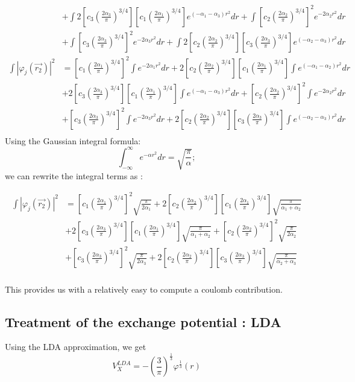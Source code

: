 \documentclass{article}
\begin{document}
\begin{align*}
                             &+ \int 2\left[ c_3 \left( \frac{2\alpha_3}{\pi} \right)^{3/4} \right] \left[ c_1  \left( \frac{2\alpha_1}{\pi} \right)^{3/4} \right] e^{(-\alpha_1  - \alpha_3 )r^2}dr + \int \left[ c_2  \left( \frac{2\alpha_2}{\pi} \right)^{3/4} \right] ^2 e^{-2\alpha_2 r^2}dr \\ 
                             &+ \int \left[ c_3  \left( \frac{2\alpha_3}{\pi} \right)^{3/4} \right] ^2 e^{-2\alpha_3 r^2}dr + \int 2 \left[ c_2 \left( \frac{2\alpha_2}{\pi} \right)^{3/4} \right] \left[ c_3  \left( \frac{2\alpha_3}{\pi} \right)^{3/4} \right] e^{(-\alpha_2 - \alpha_3 )r^2}dr \\
   \int |\varphi_j(\vec{r_2})|^2                         &= \left[ c_1  \left( \frac{2\alpha_1}{\pi} \right)^{3/4} \right] ^2 \int e^{-2\alpha_1 r^2}dr + 2 \left[ c_2 \left( \frac{2\alpha_2}{\pi} \right)^{3/4} \right] \left[ c_1  \left( \frac{2\alpha_1}{\pi} \right)^{3/4} \right] \int e^{(-\alpha_1 - \alpha_2 )r^2}dr \\
                             &+ 2\left[ c_3 \left( \frac{2\alpha_3}{\pi} \right)^{3/4} \right] \left[ c_1  \left( \frac{2\alpha_1}{\pi} \right)^{3/4} \right] \int e^{(-\alpha_1  - \alpha_3 )r^2}dr + \left[ c_2  \left( \frac{2\alpha_2}{\pi} \right)^{3/4} \right] ^2 \int e^{-2\alpha_2 r^2}dr \\ 
                             &+ \left[ c_3  \left( \frac{2\alpha_3}{\pi} \right)^{3/4} \right] ^2 \int e^{-2\alpha_3 r^2}dr + 2 \left[ c_2 \left( \frac{2\alpha_2}{\pi} \right)^{3/4} \right] \left[ c_3  \left( \frac{2\alpha_3}{\pi} \right)^{3/4} \right] \int e^{(-\alpha_2 - \alpha_3 )r^2}dr \\
\end{align*}
   Using the Gaussian integral formula:  \[\int_{-\infty}^{\infty} e^{-\alpha r^2}dr = \sqrt{\frac{\pi}{\alpha}};\] we can rewrite the integral terms as : 

   \begin{align*}
    \int |\varphi_j(\vec{r_2})|^2                         &= \left[ c_1  \left( \frac{2\alpha_1}{\pi} \right)^{3/4} \right] ^2 \sqrt{\frac{\pi}{2\alpha_1}}  + 2 \left[ c_2 \left( \frac{2\alpha_2}{\pi} \right)^{3/4} \right] \left[ c_1  \left( \frac{2\alpha_1}{\pi} \right)^{3/4} \right] \sqrt{\frac{\pi}{\alpha_1+ \alpha_2}}\\
    &+ 2\left[ c_3 \left( \frac{2\alpha_3}{\pi} \right)^{3/4} \right] \left[ c_1  \left( \frac{2\alpha_1}{\pi} \right)^{3/4} \right] \sqrt{\frac{\pi}{\alpha_1 + \alpha_2}} + \left[ c_2  \left( \frac{2\alpha_2}{\pi} \right)^{3/4} \right] ^2 \sqrt{\frac{\pi}{2\alpha_2}} \\ 
    &+ \left[ c_3  \left( \frac{2\alpha_3}{\pi} \right)^{3/4} \right] ^2 \sqrt{\frac{\pi}{2\alpha_3}}  + 2 \left[ c_2 \left( \frac{2\alpha_2}{\pi} \right)^{3/4} \right] \left[ c_3  \left( \frac{2\alpha_3}{\pi} \right)^{3/4} \right] \sqrt{\frac{\pi}{\alpha_2 + \alpha_3}}  \\
   \end{align*}

This provides us with a relatively easy to compute a coulomb contribution.

\subsection{Treatment of the exchange potential : LDA}
Using the LDA approximation, we get \[ V^{LDA}_X  = -(\frac{3}{\pi})^{\frac{1}{3}} \varphi^{\frac{1}{3}}(r)\]



 
\end{document}

